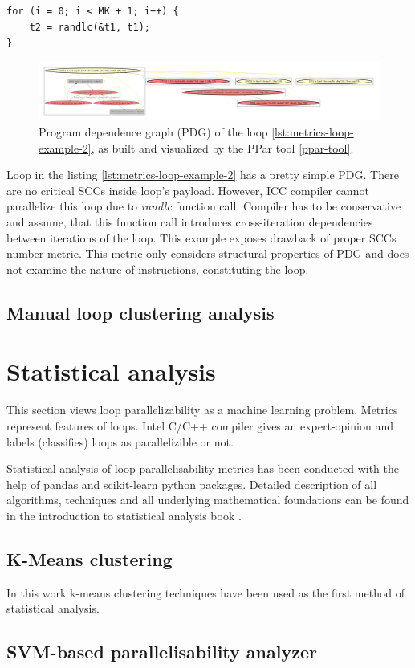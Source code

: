 \begin{lstlisting}[caption={Non-parallelizible loop. Function call inside loop's body prevents ICC compiler from parallelizing it. Loop taken from EP NAS benchmark.}, captionpos=b, label=lst:metrics-loop-example-2, float,floatplacement=H]
for (i = 0; i < MK + 1; i++) {
	t2 = randlc(&t1, t1);
}
\end{lstlisting}

\begin{figure}[htb]
	\centering
	\includegraphics[width=\linewidth]{figs/metrics-example-loop-2-pdg.pdf}
	\caption{Program dependence graph (PDG) of the loop \ref{lst:metrics-loop-example-2}, as built and visualized by the PPar tool \ref{ppar-tool}.}
	\label{metrics-example-loop-2-pdg}
\end{figure}

\null\qquad Loop in the listing \ref{lst:metrics-loop-example-2} has a pretty simple PDG. There are no critical SCCs inside loop's payload. However, ICC compiler cannot parallelize this loop due to \textit{randlc} function call. Compiler has to be conservative and assume, that this function call introduces cross-iteration dependencies between iterations of the loop.\newline
\null\qquad This example exposes drawback of proper SCCs number metric. This metric only considers structural properties of PDG and does not examine the nature of instructions, constituting the loop. 
\subsection{Manual loop clustering analysis}


\section{Statistical analysis}
\label{analysis-statistical-analysis}
\qquad This section views loop parallelizability as a machine learning problem. Metrics represent features of loops. Intel C/C++ compiler gives an expert-opinion and labels (classifies) loops as parallelizible or not.
   
\qquad Statistical analysis of loop parallelisability metrics has been conducted with the help of pandas \cite{python-lib-pandas} and scikit-learn \cite{python-lib-scikit-learn} python packages. Detailed description of all algorithms, techniques and all underlying mathematical foundations can be found in the introduction to statistical analysis book \cite{statistical-learning-book}.

\subsection{K-Means clustering}

\qquad In this work k-means clustering techniques have been used as the first method of statistical analysis.




\subsection{SVM-based parallelisability analyzer}